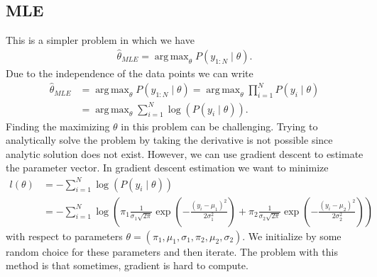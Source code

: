 \documentclass[10pt ]{article}
\DeclareMathOperator*{\argmaxA}{arg\,max}
\begin{document}
\subsection{MLE}
This is a simpler problem in which we have
\begin{align}
\hat{\theta}_{MLE} = \argmaxA_{\theta} P(y_{1:N} \mid \theta).
\end{align}
Due to the independence of the data points we can write
\begin{align}
\hat{\theta}_{MLE} &= \argmaxA_{\theta} P(y_{1:N} \mid \theta) = \argmaxA_{\theta} \prod_{i=1}^N P(y_i \mid \theta) \nonumber \\ 
&= \argmaxA_{\theta} \sum_{i=1}^N \log \left( P(y_i \mid \theta) \right).
\end{align}
 Finding the maximizing $\theta$ in this problem can be challenging. Trying to analytically solve the problem by taking the derivative is not possible since analytic solution does not exist. However, we can use gradient descent to estimate the parameter vector.  In gradient descent estimation we want to minimize
 \begin{align}
l (\theta)  &=  -\sum_{i=1}^N \log \left( P(y_i \mid \theta) \right) \nonumber \\ &= -\sum_{i=1}^N \log \left( \pi_1 \frac{1}{\sigma_1 \sqrt{2 \pi}} \exp \left( -\frac{(y_i-\mu_1)^2}{2\sigma_1^2}\right) + \pi_2 \frac{1}{\sigma_2 \sqrt{2 \pi}} \exp \left( -\frac{(y_i-\mu_2)^2}{2\sigma_2^2}\right) \right)  \nonumber 
\end{align}
with respect to parameters  $\theta = (\pi_1, \mu_1, \sigma_1, \pi_2, \mu_2, \sigma_2)$. We initialize by some random choice for these parameters and then iterate.  The problem with this method is that sometimes, gradient is hard to compute. 
\end{document}
